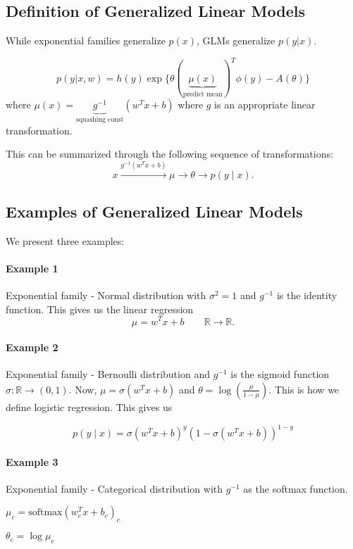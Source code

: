 \documentclass{article}
\begin{document}
\subsection{Definition of Generalized Linear Models}

While exponential families generalize $p(x)$, GLMs generalize $p(y|x)$.

\[
p(y | x,w) = h(y)\exp\{\theta(\underbrace{\mu(x)}_{\text{predict mean}})^T\phi(y) - A(\theta)\}
\]
where $\mu(x) = \underbrace{g^{-1}}_{\text{squashing const}}(w^Tx + b)$
where $g$ is an appropriate linear transformation.

This can be summarized through the following sequence of transformations:
$$
x \overset{g^{-1}(w^T x + b)}{\longrightarrow} \mu \to \theta \to p(y \mid x).
$$

\subsection{Examples of Generalized Linear Models}
We present three examples:
\paragraph{Example 1} Exponential family - Normal distribution with $\sigma^2 = 1$ and $g^{-1}$ is the identity function.
This gives us the linear regression
$$
\mu = w^Tx + b \qquad \mathbb{R} \to \mathbb{R}.
$$

\paragraph{Example 2} Exponential family - Bernoulli distribution and $g^{-1}$ is the sigmoid function $\sigma: \mathbb{R} \rightarrow (0, 1)$.
Now, $\mu = \sigma(w^Tx + b)$ and $\theta = \log \left(\frac{\mu }{1 - \mu}\right)$. This is how we define logistic regression. This gives us

$$p(y \mid x) = \sigma(w^Tx + b)^y(1 - \sigma(w^Tx + b))^{1-y}$$

\paragraph{Example 3} Exponential family - Categorical distribution with $g^{-1}$ as the softmax function.

$\mu_c = \text{softmax}(w_c^T x + b_c)_c$

$\theta_c = \log \mu_c$
\end{document}
